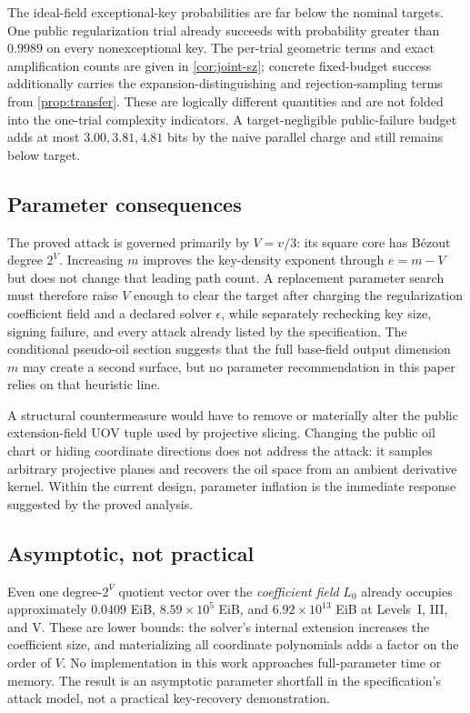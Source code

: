 \documentclass[10pt,a4paper]{article}
\begin{document}
The ideal-field exceptional-key probabilities are far below the nominal targets.  One public regularization trial already succeeds with probability greater than $0.9989$ on every nonexceptional key.  The per-trial geometric terms and exact amplification counts are given in \cref{cor:joint-sz}; concrete fixed-budget success additionally carries the expansion-distinguishing and rejection-sampling terms from \cref{prop:transfer}.  These are logically different quantities and are not folded into the one-trial complexity indicators.  A target-negligible public-failure budget adds at most $3.00,3.81,4.81$ bits by the naive parallel charge and still remains below target.

\subsection{Parameter consequences}

The proved attack is governed primarily by $V=v/3$: its square core has B\'ezout degree $2^V$.  Increasing $m$ improves the key-density exponent through $e=m-V$ but does not change that leading path count.  A replacement parameter search must therefore raise $V$ enough to clear the target after charging the regularization coefficient field and a declared solver $\epsilon$, while separately rechecking key size, signing failure, and every attack already listed by the specification.  The conditional pseudo-oil section suggests that the full base-field output dimension $m$ may create a second surface, but no parameter recommendation in this paper relies on that heuristic line.

A structural countermeasure would have to remove or materially alter the public extension-field UOV tuple used by projective slicing.  Changing the public oil chart or hiding coordinate directions does not address the attack: it samples arbitrary projective planes and recovers the oil space from an ambient derivative kernel.  Within the current design, parameter inflation is the immediate response suggested by the proved analysis.

\subsection{Asymptotic, not practical}

Even one degree-$2^V$ quotient vector over the \emph{coefficient field} $L_0$ already occupies approximately $0.0409$ EiB, $8.59\times10^5$ EiB, and $6.92\times10^{13}$ EiB at Levels~I, III, and V.  These are lower bounds: the solver's internal extension increases the coefficient size, and materializing all coordinate polynomials adds a factor on the order of $V$.  No implementation in this work approaches full-parameter time or memory.  The result is an asymptotic parameter shortfall in the specification's attack model, not a practical key-recovery demonstration.
\end{document}
